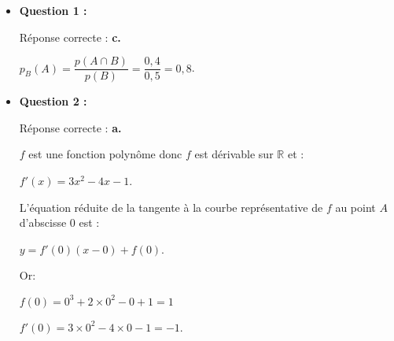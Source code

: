 \begin{corrige}
     \begin{itemize}
          \item \textbf{Question 1 :}
          \par
          Réponse correcte :\quad\textbf{ c.}
          \par
          $p_B(A)=\dfrac{p(A \cap B)}{p(B)}=\dfrac{0,4}{0,5}=0,8$.
          \par
          \item \textbf{Question 2 :}
          \par
          Réponse correcte :\quad\textbf{ a.}
          \par
          $f$ est une fonction polynôme donc $f$ est dérivable sur $\mathbb{R}$ et :
          \par
          $f'(x)=3x^2-4x-1$.
          \par
          L'équation réduite de la tangente à la courbe représentative de $f$ au point $A$ d'abscisse $0$ est :
          \par
          $y=f'(0)(x-0)+f(0)$.
          \par
          Or:
          \par
          $f(0)=0^3+2 \times 0^2 - 0 + 1 =1$
          \par
          $f'(0)=3 \times 0^2 - 4 \times 0 - 1 = -1$.

\end{itemize}
\end{corrige}
